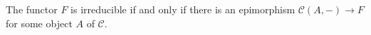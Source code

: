 The functor  $F$ is irreducible if and only if there is an epimorphism
$\mathcal{C}(A, {-})\to F$ for some object $A$ of $\mathcal{C}$.

